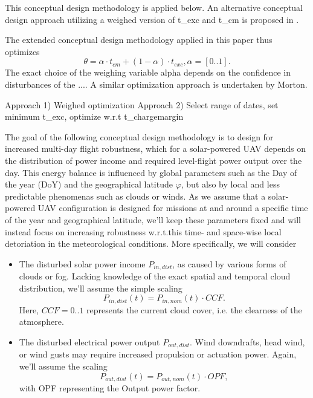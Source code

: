 \documentclass[letterpaper, 10 pt, conference]{ieeeconf}  %
\begin{document}
This conceptual design methodology is applied below. An alternative conceptual design approach utilizing a weighed version of t_{exc} and t_{cm} is proposed in \cite{Morton_ICRA2013}. 

The extended conceptual design methodology applied in this paper thus optimizes
\begin{equation} \label{eqn:optvariable}
\theta=\alpha\cdot t_{cm}+(1-\alpha)\cdot t_{exc}, \alpha=[0..1].
\end{equation}
The exact choice of the weighing variable alpha depends on the confidence in disturbances of the .... A similar optimization approach is undertaken by Morton. 

Approach 1) Weighed optimization
Approach 2) Select range of dates, set minimum t\_exc, optimize w.r.t t\_chargemargin







The goal of the following conceptual design methodology is to design for increased multi-day flight robustness, which for a solar-powered UAV depends on the distribution of power income and required level-flight power output over the day. This energy balance is influenced by global parameters such as the Day of the year (DoY) and the geographical latitude $\varphi$, but also by local and less predictable phenomenas such as clouds or winds. As we assume that a solar-powered UAV configuration is designed for missions at and around a specific time of the year and geographical latitude, we'll keep these parameters fixed and will instead focus on increasing robustness w.r.t.this time- and space-wise local detoriation in the meteorological conditions. More specifically, we will consider

 \begin{itemize}
\item The disturbed solar power income $P_{in,dist}$, as caused by various forms of clouds or fog. Lacking knowledge of the exact spatial and temporal cloud distribution, we'll assume the simple scaling $$ P_{in,dist}(t) = P_{in,nom}(t) \cdot CCF. $$ Here, $CCF=0..1$ \cite{Kimura_SolarRadAndClouds} represents the current cloud cover, i.e. the clearness of the atmosphere.
\item The disturbed electrical power output $P_{out,dist}$. Wind downdrafts, head wind, or wind gusts may require increased propulsion or actuation power. Again, we'll assume the scaling  $$ P_{out,dist}(t) = P_{out,nom}(t) \cdot OPF, $$ with OPF representing the Output power factor.
\end{itemize}
\end{document}

